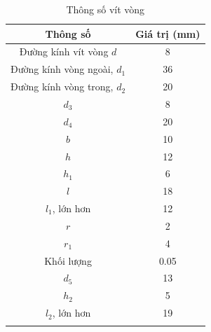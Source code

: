             \begin{longtable}{|c|c|}
                \hline
                \textbf{Thông số} & \textbf{Giá trị (mm)} \\
                \hline
                Đường kính vít vòng $d$ & 8 \\
                \hline
                Đường kính vòng ngoài, $d_1$ & 36 \\
                \hline
                Đường kính vòng trong, $d_2$ & 20 \\
                \hline
                $d_3$ & 8 \\  
                \hline
                $d_4$ & 20 \\
                \hline
                $b$ & 10 \\
                \hline
                $h$ & 12 \\
                \hline
                $h_1$ & 6 \\
                \hline
                $l$ & 18 \\
                \hline
                $l_1$, lớn hơn & 12 \\
                \hline
                $r$ & 2 \\
                \hline
                $r_1$ & 4 \\
                \hline
                Khối lượng & 0.05 \\
                \hline
                \centering $d_5$ & 13 \\
                \hline
                $h_2$ & 5 \\
                \hline
                \centering $l_2$, lớn hơn & 19 \\
                \hline
                \caption{Thông số vít vòng}
            \end{longtable}
